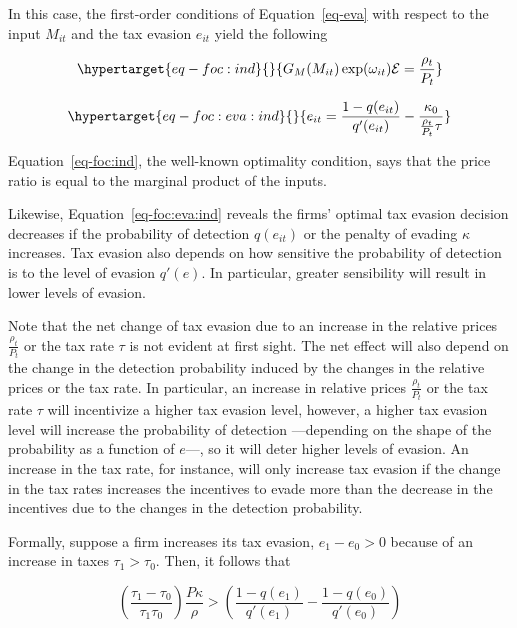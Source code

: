 \documentclass[
  12pt]{article}
\begin{document}
In this case, the first-order conditions of Equation~\ref{eq-eva} with
respect to the input \(M_{it}\) and the tax evasion \(e_{it}\) yield the
following

\begin{equation}\protect\hypertarget{eq-foc:ind}{}{
G_M(M_{it})\exp(\omega_{it})\mathcal{E}=\frac{\rho_{t}}{P_t}
}\label{eq-foc:ind}\end{equation}

\begin{equation}\protect\hypertarget{eq-foc:eva:ind}{}{
e_{it}=\frac{1-q(e_{it})}{q'(e_{it})}-\frac{\kappa_0}{\frac{\rho_{t}}{P_t}\tau}
}\label{eq-foc:eva:ind}\end{equation}

Equation~\ref{eq-foc:ind}, the well-known optimality condition, says
that the price ratio is equal to the marginal product of the inputs.

Likewise, Equation~\ref{eq-foc:eva:ind} reveals the firms' optimal tax
evasion decision decreases if the probability of detection \(q(e_{it})\)
or the penalty of evading \(\kappa\) increases. Tax evasion also depends
on how sensitive the probability of detection is to the level of evasion
\(q'(e)\). In particular, greater sensibility will result in lower
levels of evasion.

Note that the net change of tax evasion due to an increase in the
relative prices \(\frac{\rho_{t}}{P_t}\) or the tax rate \(\tau\) is not
evident at first sight. The net effect will also depend on the change in
the detection probability induced by the changes in the relative prices
or the tax rate. In particular, an increase in relative prices
\(\frac{\rho_{t}}{P_t}\) or the tax rate \(\tau\) will incentivize a
higher tax evasion level, however, a higher tax evasion level will
increase the probability of detection ---depending on the shape of the
probability as a function of \(e\)---, so it will deter higher levels of
evasion. An increase in the tax rate, for instance, will only increase
tax evasion if the change in the tax rates increases the incentives to
evade more than the decrease in the incentives due to the changes in the
detection probability.

Formally, suppose a firm increases its tax evasion, \(e_1-e_0>0\)
because of an increase in taxes \(\tau_1>\tau_0\). Then, it follows that

\[
\left(\frac{\tau_1-\tau_0}{\tau_1\tau_0}\right)\frac{P\kappa}{\rho}>
  \left(\frac{1-q(e_1)}{q'(e_1)}-\frac{1-q(e_0)}{q'(e_0)}\right)
\]
\end{document}
